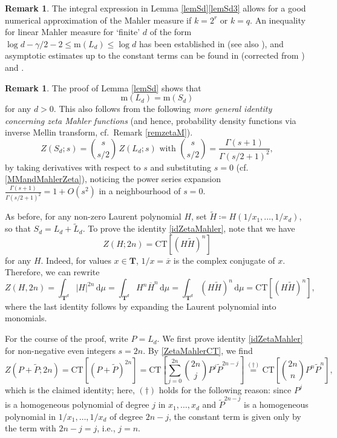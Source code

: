 \documentclass[12pt,reqno]{amsart}
\theoremstyle{definition}
\theoremstyle{plain}
\theoremstyle{definition}
\newtheorem{remark}[theorem]{Remark}
\newcommand{\T}{\mathbf{T}}
\newcommand\m{\mathrm{m}}
\renewcommand{\leq}{\leqslant}
\renewcommand{\d}{\mathrm{d}}
\begin{document}
\begin{remark}
The integral expression in Lemma \ref{lemSd}\eqref{lemSd3} allows for a good numerical approximation of the Mahler measure if $k = 2^r$ or $k = q$. An inequality for linear Mahler measure for `finite' $d$ of the form  $ \log d - \gamma/2 - 2 \leq \m(L_d) \leq \log d$ has been established in \cite[Thm.\ 1]{RVTV} (see also \cite{Laila}), and asymptotic estimates up to the constant terms can be found in \cite{MyersonSmyth} (corrected from \cite{SmythMP}) and \cite[Thm.\ 2]{RVTV}. 
\end{remark}





\begin{remark} The proof of Lemma \ref{lemSd} shows that \begin{equation} \label{eqmsym} \m(L_d) = \m(S_d) \end{equation}  for any $d>0$. 
This also follows from the following \emph{more general identity concerning zeta Mahler functions} (and hence, probability density functions via inverse Mellin transform, cf.\ Remark \ref{remzetaM}). 
\begin{equation} \label{idZetaMahler} 
Z(S_d; s) = \binom{s}{s/2}\, Z(L_d;s) \mbox{ with }  \binom{s}{s/2} = \frac{\Gamma(s+1)}{\Gamma(s/2+1)^2},
\end{equation} 
by taking derivatives with respect to $s$ and substituting $s=0$ (cf. \eqref{MMandMahlerZeta}), noticing the power series expansion $\frac{\Gamma(s+1)}{\Gamma(s/2+1)^2} = 1 +O(s^2)$ in a neighbourhood of $s=0$. 

As before, for any non-zero Laurent polynomial $H$, set $\tilde H \coloneqq H(1/x_1,\dots,1/x_d)$, so that $S_d = L_d + \tilde L_d$.  To prove the identity \eqref{idZetaMahler},  note that  we have
\begin{equation} \label{ZetaMahlerCT}
  Z(H;2n) = \text{CT}[(H \tilde H)^n]
  \end{equation} 
 for any $H$. Indeed, for values  $x \in \T$, $1/x = \overline x$ is the complex conjugate of $x$. Therefore, we can rewrite 
 $$ Z(H,2n) = \int_{\T^d} |H|^{2n} \, \d \mu = \int_{\T^d} H^n \overline H^n \, \d \mu =  \int_{\T^d} (H \tilde H)^n \, \d \mu = \text{CT}[(H \tilde H)^n], $$
 where the last identity follows by expanding the Laurent polynomial into monomials. 

For the course of the proof, write $P=L_d$. We first prove identity \eqref{idZetaMahler} for non-negative even integers $s=2n$. By \eqref{ZetaMahlerCT}, we find 
$$ Z(P + \tilde P; 2n) = \text{CT}[(P+\tilde P)^{2n}] = \text{CT}[\sum_{j=0}^{2n} \binom{2n}{j} P^j \tilde P^{2n-j}] \overset{(\dagger)}{=} \text{CT}[\binom{2n}{n} P^n \tilde P^{n}], $$
which is the claimed identity; here, $(\dagger)$ holds for the following reason: since $P^j$ is a homogeneous polynomial of degree $j$ in $x_1,\dots,x_d$ and $\tilde P^{2n-j}$ is a homogeneous polynomial in $1/x_1,\dots,1/x_d$ of degree $2n-j$, the constant term is given only by the term with $2n-j=j$, i.e., $j=n$. 


\end{remark}
\end{document}
